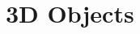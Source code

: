 \hypertarget{group___e_g_x_math-_geometry-3_d}{}\section{3D Objects}
\label{group___e_g_x_math-_geometry-3_d}
